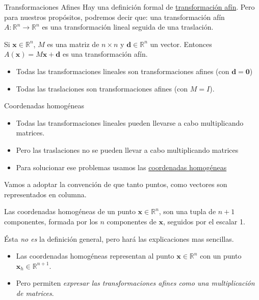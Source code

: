 \begin{frame}{Transformaciones Afines}
Hay una definición formal de \href{https://en.wikipedia.org/wiki/Affine_transformation}{transformación afín}. Pero para nuestros propósitos, podremos decir que: una transformación afín $A: \mathbb{R}^n \rightarrow \mathbb{R}^n$ es una transformación lineal seguida de una traslación.

\begin{block}{}
    Si $\mathbf{x} \in \mathbb{R}^n$, $M$ es una matriz de $n \times n$ y $\mathbf{d} \in \mathbb{R}^n$ un vector.
    Entonces $A(\mathbf{x}) = M \mathbf{x} + \mathbf{d}$ es una transformación afín.
\end{block}
\begin{itemize}
    \item Todas las transformaciones lineales son transformaciones afines (con $\mathbf{d} = \mathbf{0}$)
    \item Todas las traslaciones son transformaciones afines (con $M = I$).
\end{itemize}
\end{frame}


\begin{frame}{Coordenadas homogéneas}

\begin{itemize}
    \item Todas las transformaciones lineales pueden llevarse a cabo multiplicando matrices.
    \item Pero las traslaciones no se pueden llevar a cabo multiplicando matrices
    \item Para solucionar ese problemas usamos las \href{https://en.wikipedia.org/wiki/Homogeneous_coordinates}{coordenadas homogéneas}
\end{itemize}
Vamos a adoptar la convención de que tanto puntos, como vectores son representados en columna.
\begin{block}{}
    Las coordenadas homogéneas de un punto $\mathbf{x} \in \mathbb{R}^n$, son una tupla de $n+1$ componentes, formada por los $n$ componentes de $\mathbf{x}$, seguidos por el escalar 1.
\end{block}
Ésta \emph{no es} la definición general, pero hará las explicaciones mas sencillas.
\begin{itemize}
    \item Las coordenadas homogéneas representan al punto $\mathbf{x} \in \mathbb{R}^n$ con un punto $\mathbf{x}_{h} \in \mathbb{R}^{n+1}$.
    \item Pero permiten \emph{expresar las transformaciones afines como una multiplicación de matrices}.
\end{itemize}

\end{frame}

